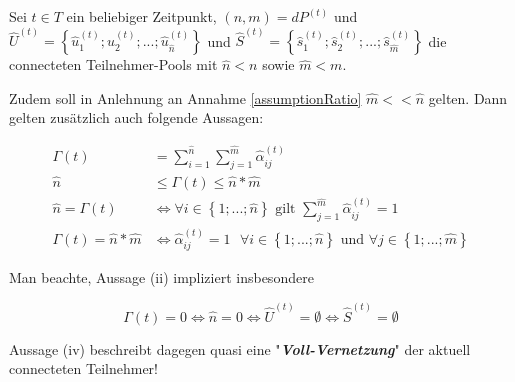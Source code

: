 \begin{Theorem}\label{theremConnectionsCount}

Sei $t \in T$ ein beliebiger Zeitpunkt, $(n, m) = dP^{(t)}$ und $\widehat{U}^{(t)} = \left\{ \widehat{u}^{(t)}_1; \widehat{u}^{(t)}_2;...; \widehat{u}^{(t)}_{\widehat{n}} \right\}$ und $\widehat{S}^{(t)} = \left\{ \widehat{s}^{(t)}_1; \widehat{s}^{(t)}_2;...; \widehat{s}^{(t)}_{\widehat{m}} \right\}$ die connecteten Teilnehmer-Pools mit $\widehat{n} < n$ sowie $\widehat{m} < m$.

Zudem soll in Anlehnung an Annahme \ref{assumptionRatio} $\widehat{m} << \widehat{n}$ gelten. Dann gelten zusätzlich auch folgende Aussagen:

\vspace{0.3cm}

\begin{align*}
\Gamma(t)&= \sum_{i=1}^{\widehat{n}} \sum_{j=1}^{\widehat{m}} \widehat{\alpha}^{(t)}_{ij} \tag{i} \label{theremConnectionsCount_1} \\ 
\widehat{n} &\leq \Gamma(t) \leq \widehat{n} * \widehat{m} \tag{ii} \\
\widehat{n} = \Gamma(t) &\Leftrightarrow \forall i \in \left\{1;...; \widehat{n} \right\}
\textrm{ gilt } \sum_{j=1}^{\widehat{m}} \widehat{\alpha}^{(t)}_{ij} = 1 \tag{iii} \\
\Gamma(t) = \widehat{n} * \widehat{m} &\Leftrightarrow \widehat{\alpha}^{(t)}_{ij} = 1 \textrm{  } \forall i \in \left\{1;...; \widehat{n} \right\} \textrm{ und } \forall j \in \left\{1;...; \widehat{m} \right\} \tag{iv}
\end{align*}

\vspace{0.3cm}

Man beachte, Aussage (ii) impliziert insbesondere

\begin{equation*}
\Gamma(t) = 0 \Leftrightarrow \widehat{n} = 0 \Leftrightarrow \widehat{U}^{(t)} = \emptyset  \Leftrightarrow \widehat{S}^{(t)} = \emptyset
\end{equation*}

\vspace{0.3cm}

Aussage (iv) beschreibt dagegen quasi eine "\textbf{\textit{Voll-Vernetzung}}" der aktuell connecteten Teilnehmer!

\end{Theorem}

\vspace{0.3cm}


